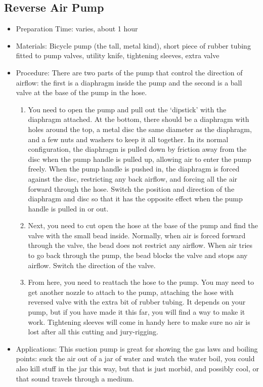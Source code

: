 	
	


\subsection{Reverse Air Pump}
\begin{itemize}
\item{Preparation Time: varies, about 1 hour}
\item{Materials: Bicycle pump (the tall, metal kind), short piece of rubber tubing fitted to pump valves, utility knife, tightening sleeves, extra valve}
\item{Procedure: There are two parts of the pump that control the direction of airflow: the first is a diaphragm inside the pump and the second is a ball valve at the base of the pump in the hose.
\begin{enumerate}
\item{You need to open the pump and pull out the ‘dipstick’ with the diaphragm attached. At the bottom, there should be a diaphragm with holes around the top, a metal disc the same diameter as the diaphragm, and a few nuts and washers to keep it all together. In its normal configuration, the diaphragm is pulled down by friction away from the disc when the pump handle is pulled up, allowing air to enter the pump freely. When the pump handle is pushed in, the diaphragm is forced against the disc, restricting any back airflow, and forcing all the air forward through the hose. Switch the position and direction of the diaphragm and disc so that it has the opposite effect when the pump handle is pulled in or out.}
\item{Next, you need to cut open the hose at the base of the pump and find the valve with the small bead inside. Normally, when air is forced forward through the valve, the bead does not restrict any airflow. When air tries to go back through the pump, the bead blocks the valve and stops any airflow. Switch the direction of the valve.}
\item{From here, you need to reattach the hose to the pump. You may need to get another nozzle to attach to the pump, attaching the hose with reversed valve with the extra bit of rubber tubing. It depends on your pump, but if you have made it this far, you will find a way to make it work. Tightening sleeves will come in handy here to make sure no air is lost after all this cutting and jury-rigging.}
\end{enumerate}
} %
\item{Applications: This suction pump is great for showing the gas laws and boiling points: suck the air out of a jar of water and watch the water boil, you could also kill stuff in the jar this way, but that is just morbid, and possibly cool, or that sound travels through a medium.}
\end{itemize}
